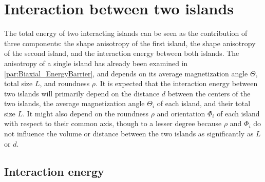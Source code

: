 \documentclass[11pt,a4paper,english]{article}
\begin{document}
\section{Interaction between two islands}
The total energy of two interacting islands can be seen as the contribution of three components: the shape anisotropy of the first island, the shape anisotropy of the second island, and the interaction energy between both islands. The anisotropy of a single island has already been examined in \cref{par:Biaxial_EnergyBarrier}, and depends on its average magnetization angle $\Theta$, total size $L$, and roundness $\rho$. It is expected that the interaction energy between two islands will primarily depend on the distance $d$ between the centers of the two islands, the average magnetization angle $\Theta_i$ of each island, and their total size $L$. It might also depend on the roundness $\rho$ and orientation $\Phi_i$ of each island with respect to their common axis, though to a lesser degree because $\rho$ and $\Phi_i$ do not influence the volume or distance between the two islands as significantly as $L$ or $d$.

\subsection{Interaction energy}
\label{par:TwoIslands_InteractionAngle}
\end{document}
